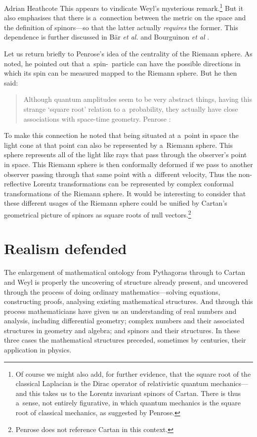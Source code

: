 \begin{artengenv}{Adrian Heathcote}
This appears to vindicate Weyl's mysterious remark.\footnote{Of course we might also add, for further evidence, that the square root of the classical Laplacian is the Dirac operator of relativistic quantum mechanics---and this takes us to the Lorentz invariant spinors of Cartan. There is thus a~sense, not entirely figurative, in which quantum mechanics is the square root of classical mechanics, as suggested by Penrose.} But it also emphasises that there is a~connection between the metric on the space and the definition of spinors---so that the latter actually \textit{requires} the former. This dependence is further discussed in Bär \textit{et al.} \parencite*{bar_generalized_2005} and Bourguinon \textit{et al} \parencite*{bourguignon_spinorial_2015}.

Let us return briefly to Penrose's idea of the centrality of the Riemann sphere. As noted, he pointed out that a~spin-\textonehalf\ particle can have the possible directions in which its spin can be measured mapped to the Riemann sphere. But he then said:
\begin{quotation}
Although quantum amplitudes seem to be very abstract things, having this strange `square root' relation to a~probability, they actually have close associations with space-time geometry. Penrose \parencite[230]{arnold_mathematical_2000}:
\end{quotation}
To make this connection he noted that being situated at a~point in space the light cone at that point can also be represented by a~Riemann sphere. This sphere represents all of the light like rays that pass through the observer's point in space. This Riemann sphere is then conformally deformed if we pass to another observer passing through that same point with a~different velocity, Thus the non-reflective Lorentz transformations can be represented by complex conformal transformations of the Riemann sphere. It would be interesting to consider that these different usages of the Riemann sphere could be unified by Cartan's geometrical picture of spinors as square roots of null vectors.\footnote{Penrose \parencite*{penrose_road_2004_ah} does not reference Cartan in this context.}


\section{Realism defended}


The enlargement of mathematical ontology from Pythagoras through to Cartan and Weyl is properly the uncovering of structure already present, and uncovered through the process of doing ordinary mathematics---solving equations, constructing proofs, analysing existing mathematical structures. And through this process mathematicians have given us an understanding of real numbers and analysis, including differential geometry; complex numbers and their associated structures in geometry and algebra; and spinors and their structures. In these three cases the mathematical structures preceded, sometimes by centuries, their application in physics. 


\end{artengenv}
